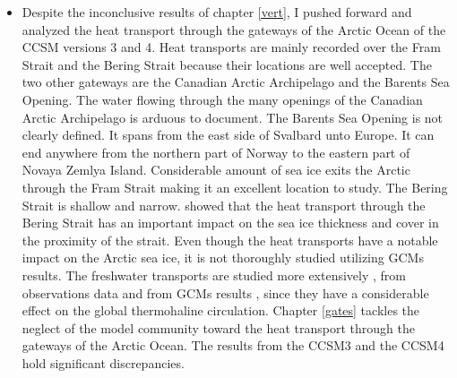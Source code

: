 \begin{itemize}
\item Despite the inconclusive results of chapter \ref{vert}, I pushed forward and analyzed the heat transport through the gateways of the Arctic Ocean of the CCSM versions 3 and 4. Heat transports are mainly recorded over the Fram Strait and the Bering Strait \citep{Beszc2011} because their locations are well accepted. The two other gateways are the Canadian Arctic Archipelago and the Barents Sea Opening. The water flowing through the many openings of the Canadian Arctic Archipelago is arduous to document. The Barents Sea Opening is not clearly defined. It spans from the east side of Svalbard unto Europe. It can end anywhere from the northern part of Norway to the eastern part of Novaya Zemlya Island. Considerable amount of sea ice exits the Arctic through the Fram Strait \citep{smeds2017} making it an excellent location to study. The Bering Strait is shallow and narrow.  \cite{Woodgate2010} showed that the heat transport through the Bering Strait has an important impact on the sea ice thickness and cover in the proximity of the strait. Even though the heat transports have a notable impact on the Arctic sea ice, it is not thoroughly studied utilizing GCMs results. The freshwater transports are studied more extensively \citep{fw2001}, from observations data\citep{fwobs} and from GCMs results \citep{fwmodels}, since they have a considerable effect on the global thermohaline circulation. Chapter \ref{gates} tackles the neglect of the model community toward the heat transport through the gateways of the Arctic Ocean. The results from the CCSM3 and the CCSM4 hold significant discrepancies. 




\end{itemize}














